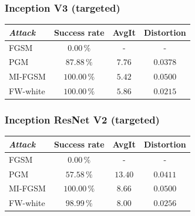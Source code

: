 \documentclass[10pt,twocolumn,letterpaper, english]{article}
\theoremstyle{definition}
\theoremstyle{plain}
\theoremstyle{plain}
\theoremstyle{plain}
\theoremstyle{plain}
\theoremstyle{remark}
\theoremstyle{remark}
\theoremstyle{definition}
\theoremstyle{definition}
\theoremstyle{definition}
\theoremstyle{definition}
\begin{document}

 



\subsubsection{Inception V3 (targeted)}

\begin{center}
    

\begin{tabular}{ |l|c|c|c| }
 \hline
  \textit{Attack} & Success rate & AvgIt & Distortion \\
 \hline
 
 FGSM   & $0.00\,\%$   &  - & -\\
 PGM&   $87.88\,\%$  & $7.76$  & $0.0378$ \\
 MI-FGSM & $100.00\,\%$ & $5.42$ & $0.0500$\\
 FW-white & $100.00\,\%$ & $5.86$ & $0.0215$\\
\hline
\end{tabular}
\end{center}


\subsubsection{Inception ResNet V2 (targeted)}

\begin{center}
    

\begin{tabular}{ |l|c|c|c| }
 \hline
  \textit{Attack} & Success rate & AvgIt & Distortion \\
 \hline
 
 FGSM   & $0.00\,\%$   &  - & -\\
 PGM&   $57.58\,\%$  & $13.40$  & $0.0411$ \\
 MI-FGSM & $100.00\,\%$ & $8.66$ & $0.0500$\\
 FW-white & $98.99\,\%$ & $8.00$ & $0.0256$\\
\hline
\end{tabular}
\end{center}
\end{document}
